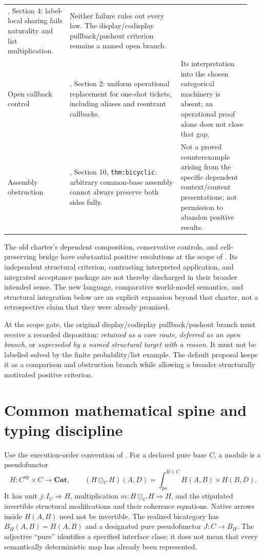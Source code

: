 \documentclass[11pt,a4paper]{article}
\newcommand{\Cat}{\mathbf{Cat}}
\begin{document}
\begin{longtable}{@{}p{0.24\linewidth}p{0.43\linewidth}p{0.27\linewidth}@{}}
\cite{Harder}, Section 4: label-local sharing fails naturality and list
multiplication. &
Neither failure rules out every law. The display/codisplay pullback/pushout
criterion remains a named open branch. \\
Open callback control &
\cite{Harder}, Section 2: uniform operational replacement for one-shot
tickets, including aliases and reentrant callbacks. &
Its interpretation into the chosen categorical machinery is absent; an
operational proof alone does not close that gap. \\
Assembly obstruction &
\cite{Unified}, Section 10, \texttt{thm:bicyclic}: arbitrary common-base
assembly cannot always preserve both sides fully. &
Not a proved counterexample arising from the specific dependent
context/content presentations; not permission to abandon positive results. \\
\bottomrule
\end{longtable}

The old charter's dependent composition, conservative controls, and
cell-preserving bridge have substantial positive resolutions at the scope of
\cite{Unified}. Its independent structural criterion, contrasting interpreted
application, and integrated acceptance package are not thereby discharged in
their broader intended sense. The new language, comparative world-model
semantics, and structural integration below are an explicit expansion beyond
that charter, not a retrospective claim that they were already promised.

At the scope gate, the original display/codisplay pullback/pushout branch must
receive a recorded disposition: \emph{retained as a core route}, \emph{deferred
as an open branch}, or \emph{superseded by a named structural target with a
reason}. It must not be labelled solved by the finite probability/list example.
The default proposal keeps it as a comparison and obstruction branch while
allowing a broader structurally motivated positive criterion.

\section{Common mathematical spine and typing discipline}\label{sec:spine}

Use the execution-order convention of \cite{Unified}. For a declared pure
base \(C\), a module is a pseudofunctor
\[
 H:C^{\mathrm{op}}\times C\longrightarrow\Cat,
 \qquad
 (H\odot_C H)(A,D)
   =\int_{\mathrm{ps}}^{B\in C}H(A,B)\times H(B,D).
\]
It has unit \(j:I_C\Rightarrow H\), multiplication
\(m:H\odot_C H\Rightarrow H\), and the stipulated invertible structural
modifications and their coherence equations. Native arrows inside
\(H(A,B)\) need not be invertible. The realized bicategory has
\(B_H(A,B)=H(A,B)\) and a designated pure pseudofunctor \(J:C\to B_H\).
The adjective ``pure'' identifies a specified interface class; it does not
mean that every semantically deterministic map has already been represented.
\end{document}
